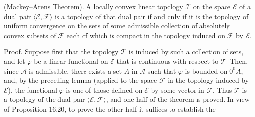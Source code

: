 (Mackey–Arens Theorem). A locally convex linear topology $\mathcal{T}$ on the space $\mathcal{E}$ of a dual pair $\langle \mathcal{E}, \mathcal{F} \rangle$ is a topology of that dual pair if and only if it is the topology of uniform convergence on the sets of some admissible collection of absolutely convex subsets of $\mathcal{F}$ each of which is compact in the topology induced on $\mathcal{F}$ by $\mathcal{E}$.

Proof. Suppose first that the topology $\mathcal{T}$ is induced by such a collection of sets, and let $\varphi$ be a linear functional on $\mathcal{E}$ that is continuous with respect to $\mathcal{T}$. Then, since $\mathcal{A}$ is admissible, there exists a set $A$ in $\mathcal{A}$ such that $\varphi$ is bounded on $0^0 A$, and, by the preceding lemma (applied to the space $\mathcal{F}$ in the topology induced by $\mathcal{E}$), the functional $\varphi$ is one of those defined on $\mathcal{E}$ by some vector in $\mathcal{F}$. Thus $\mathcal{T}$ is a topology of the dual pair $\langle \mathcal{E}, \mathcal{F} \rangle$, and one half of the theorem is proved. In view of Proposition 16.20, to prove the other half it suffices to establish the

